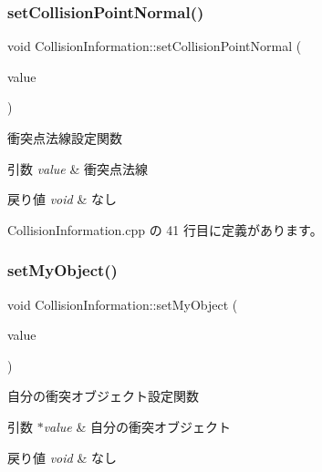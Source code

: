 \subsubsection{\texorpdfstring{set\+Collision\+Point\+Normal()}{setCollisionPointNormal()}}
{\footnotesize\ttfamily void Collision\+Information\+::set\+Collision\+Point\+Normal (\begin{DoxyParamCaption}\item[{\mbox{\hyperlink{class_vector3_d}{Vector3D}}}]{value }\end{DoxyParamCaption})}



衝突点法線設定関数 


\begin{DoxyParams}{引数}
{\em value} & 衝突点法線 \\
\hline
\end{DoxyParams}

\begin{DoxyRetVals}{戻り値}
{\em void} & なし \\
\hline
\end{DoxyRetVals}


 Collision\+Information.\+cpp の 41 行目に定義があります。

\mbox{\label{class_collision_information_a764e1ea84bdad4c3a99e2a360d759550}} 
\subsubsection{\texorpdfstring{set\+My\+Object()}{setMyObject()}}
{\footnotesize\ttfamily void Collision\+Information\+::set\+My\+Object (\begin{DoxyParamCaption}\item[{\mbox{\hyperlink{class_collision_object}{Collision\+Object}} $\ast$}]{value }\end{DoxyParamCaption})}



自分の衝突オブジェクト設定関数 


\begin{DoxyParams}{引数}
{\em $\ast$value} & 自分の衝突オブジェクト \\
\hline
\end{DoxyParams}

\begin{DoxyRetVals}{戻り値}
{\em void} & なし \\
\hline
\end{DoxyRetVals}


